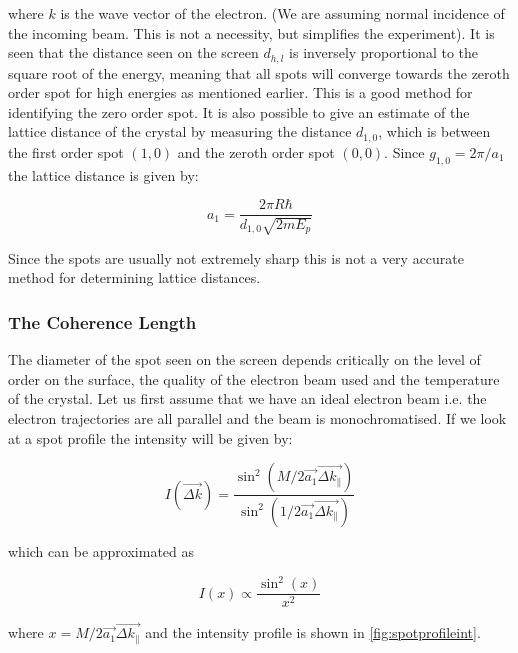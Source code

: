 \noindent where $k$ is the wave vector of the electron. (We are assuming normal incidence of the incoming beam. This is not a necessity, but simplifies the experiment). It is seen that the distance seen on the screen $d_{h,l}$ is inversely proportional to the  square root of the energy, meaning that all spots will converge towards the zeroth order spot for high energies as mentioned earlier. This is a good method for identifying  the zero order spot. It is also possible to give an estimate of the lattice distance of the crystal by measuring the distance $d_{1,0}$, which is between the first order spot $(1,0)$ and the zeroth order spot $(0,0)$. Since $g_{1,0}=2\pi/a_1$ the lattice distance is given by:

\begin{equation}
a_1=\frac{2\pi R\hbar}{d_{1,0}\sqrt{2mE_p}}
\end{equation}

Since the spots are usually not extremely sharp this is not a very accurate method for determining lattice distances.

\subsubsection{The Coherence Length}
The diameter of the spot seen on the screen depends critically on the level of order on the surface, the quality of the electron beam used and the temperature of the crystal. Let us first assume that we have an ideal electron beam i.e. the electron trajectories are all parallel and the beam is monochromatised. If we look at a spot profile the intensity will be given by:

\begin{equation}
I\left(\vec{\Delta k}\right)=\frac{\sin^2\left(M/2 \vec{a_1}\vec{\Delta k_{\parallel}}\right)}{\sin^2\left(1/2\vec{a_1}\vec{\Delta k_{\parallel}}\right)}
\end{equation}

\noindent which can be approximated as

\begin{equation}
I(x)\propto\frac{\sin^2(x)}{x^2}
\end{equation}

\noindent where $x=M/2\vec{a_1}\vec{\Delta k_{\parallel}}$ and the intensity profile is shown in \autoref{fig:spotprofileint}.

